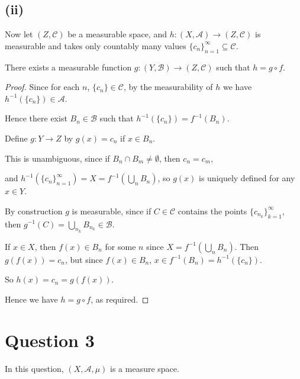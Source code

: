 \documentclass{unswmaths}
\begin{document}
\subsection*{(ii)}
Now let $(Z,\mathcal{C})$
be a measurable space, and $h:(X,\mathcal{A})\rightarrow (Z,\mathcal{C})$
is measurable and takes only countably many values $\{c_n\}_{n=1}^\infty \subseteq \mathcal{C}$.

\begin{lemma}
    There exists a measurable function $g:(Y,\mathcal{B})\rightarrow (Z,\mathcal{C})$
    such that $h = g\circ f$.
\end{lemma}
\begin{proof}
    Since for each $n$, $\{c_n\} \in \mathcal{C}$, by the measurability
    of $h$ we have $h^{-1}(\{c_n\}) \in \mathcal{A}$.
    
    Hence there exist $B_n \in \mathcal{B}$ such that $h^{-1}(\{c_n\}) = f^{-1}(B_n)$.
    
    Define $g:Y\rightarrow Z$ by $g(x) = c_n$ if $x \in B_n$. 
    
    This is unambiguous, since if $B_n \cap B_m \neq \emptyset$, then $c_n = c_m$,
    
    and $h^{-1}(\{c_n\}_{n=1}^\infty) = X = f^{-1}(\bigcup_{n} B_n)$,
    so $g(x)$ is uniquely defined for any $x \in Y$.
    
    By construction $g$ is measurable, since if $C \in \mathcal{C}$
    contains the points $\{c_{n_k}\}_{k=1}^\infty$, then $g^{-1}(C) = \bigcup_{n_k} B_{n_k} \in \mathcal{B}$.
    
    If $x \in X$, then $f(x) \in B_n$ for some $n$ since $X = f^{-1}(\bigcup_n B_n)$.
    Then $g(f(x)) = c_n$, but since $f(x) \in B_n$, $x \in f^{-1}(B_n) = h^{-1}(\{c_n\})$.
    
    So $h(x) = c_n = g(f(x))$.
    
    Hence we have $h = g\circ f$, as required.
\end{proof}

    
\section*{Question 3}
    In this question, $(X,\mathcal{A},\mu)$ is a measure space.
    
\end{document}
